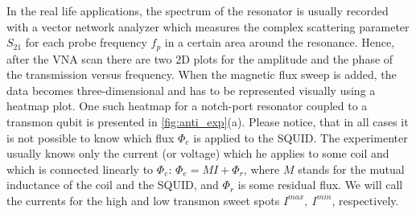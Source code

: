 \documentclass[%
 aip,
 amsmath,amssymb,
 reprint,%
]{revtex4-1}
\begin{document}
In the real life applications, the spectrum of the resonator is usually recorded with a vector network analyzer which measures the complex scattering parameter $S_{21}$ for each probe frequency $f_p$ in a certain area around the resonance. Hence, after the VNA scan there are two 2D plots for the amplitude and the phase of the transmission versus frequency. When the magnetic flux sweep is added, the data becomes three-dimensional and has to be represented  visually using a heatmap plot. One such heatmap for a notch-port resonator coupled to a transmon qubit is presented in \autoref{fig:anti_exp}(a). Please notice, that in all cases it is not possible to know which flux $\Phi_e$ is applied to the SQUID. The experimenter usually knows only the current (or voltage) which he applies to some coil and which is connected linearly to $\Phi_e$: $\Phi_e = M I + \Phi_r$, where $M$ stands for the mutual inductance of the coil and the SQUID, and $\Phi_r$ is some residual flux. We will call the currents for the high and low transmon sweet spots $I^{max},\ I^{min}$, respectively.
\end{document}

